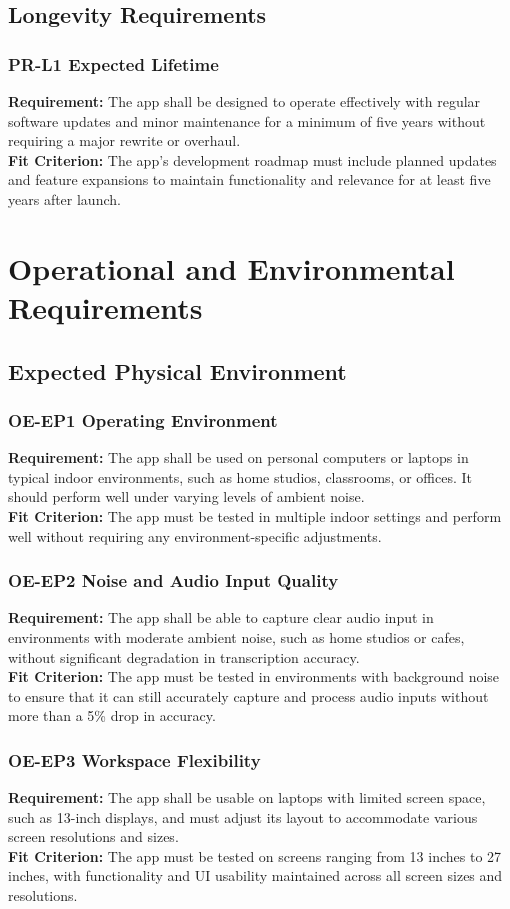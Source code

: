 \documentclass[12pt]{article}
\begin{document}
\subsection{Longevity Requirements}
\subsubsection*{PR-L1 Expected Lifetime} \label{PR-L1}
\textbf{Requirement:} The app shall be designed to operate effectively with regular software updates and minor maintenance for a minimum of five years without requiring a major rewrite or overhaul.\\
\textbf{Fit Criterion:} The app’s development roadmap must include planned updates and feature expansions to maintain functionality and relevance for at least five years after launch.

\section{Operational and Environmental Requirements}
\subsection{Expected Physical Environment}
\subsubsection*{OE-EP1 Operating Environment} \label{OE-EP1}
\textbf{Requirement:} The app shall be used on personal computers or laptops in typical indoor environments, such as home studios, classrooms, or offices. It should perform well under varying levels of ambient noise.\\
\textbf{Fit Criterion:} The app must be tested in multiple indoor settings and perform well without requiring any environment-specific adjustments.
\subsubsection*{OE-EP2 Noise and Audio Input Quality} \label{OE-EP2}
\textbf{Requirement:} The app shall be able to capture clear audio input in environments with moderate ambient noise, such as home studios or cafes, without significant degradation in transcription accuracy.\\
\textbf{Fit Criterion:} The app must be tested in environments with background noise to ensure that it can still accurately capture and process audio inputs without more than a 5\% drop in accuracy.
\subsubsection*{OE-EP3 Workspace Flexibility} \label{OE-EP3}
\textbf{Requirement:} The app shall be usable on laptops with limited screen space, such as 13-inch displays, and must adjust its layout to accommodate various screen resolutions and sizes.\\
\textbf{Fit Criterion:} The app must be tested on screens ranging from 13 inches to 27 inches, with functionality and UI usability maintained across all screen sizes and resolutions.
\end{document}
